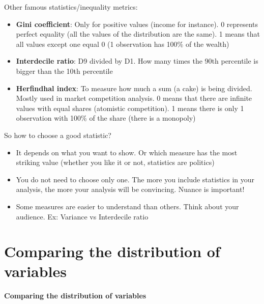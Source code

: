 \documentclass[compress]{beamer}
\begin{document}
\begin{frame}
	Other famous statistics/inequality metrics:
	\vspace{0.2cm}
	\begin{itemize}
		\item \textbf{Gini coefficient}: Only for positive values (income for instance). 0 represents perfect equality (all the values of the distribution are the same). 1 means that all values except one equal 0 (1 observation has 100\% of the wealth)
		\vspace{0.2cm}
		\item \textbf{Interdecile ratio}: D9 divided by D1. How many times the 90th percentile is bigger than the 10th percentile
		\vspace{0.2cm}
		\item \textbf{Herfindhal index}: To measure how much a sum (a cake) is being divided. Mostly used in market competition analysis. 0 means that there are infinite values with equal shares (atomistic competition). 1 means there is only 1 observation with 100\% of the share (there is a monopoly)
	\end{itemize}
\end{frame}

\begin{frame}
	So how to choose a good statistic?
	\vspace{0.2cm}
	\begin{itemize}
		\item It depends on what you want to show. Or which measure has the most striking value (whether you like it or not, statistics are politics)
		\vspace{0.2cm}
		\item You do not need to choose only one. The more you include statistics in your analysis, the more your analysis will be convincing. Nuance is important!
		\vspace{0.2cm}
		\item Some measures are easier to understand than others. Think about your audience. Ex: Variance vs Interdecile ratio
	\end{itemize}
\end{frame}

\section{Comparing the distribution of variables}
\begin{frame}[plain]
    \centering \Large
    \textbf{Comparing the distribution of variables}
\end{frame}
\end{document}
